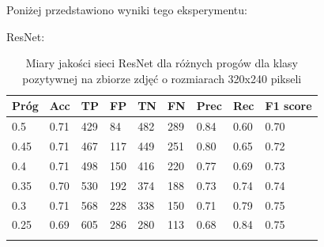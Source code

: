 \documentclass[polish,12pt]{aghthesis}
\begin{document}
\vspace{3mm}
\par\noindent Poniżej przedstawiono wyniki tego eksperymentu:
\vspace{3mm}
\par\noindent ResNet:
 \begin{longtable}[h!]{|m{2.0cm}|m{1.2cm}|m{1.2cm}|m{1.2cm}|m{1.2cm}|m{1.2cm}|m{1.2cm}|m{1.2cm}|m{1.6cm}|}
 \hline
 Próg & Acc & TP & FP & TN & FN & Prec & Rec & F1 score\\
 \hline
 0.5 & 0.71 & 429 & 84 & 482 & 289 & 0.84 & 0.60 & 0.70\\
 \hline
 0.45 & 0.71 & 467 & 117 & 449 & 251 & 0.80 & 0.65 & 0.72\\
 \hline
 0.4 & 0.71 & 498 & 150 & 416 & 220 & 0.77 & 0.69 & 0.73\\
 \hline
 0.35 & 0.70 & 530 & 192 & 374 & 188 & 0.73 & 0.74 & 0.74 \\
 \hline
 0.3 & 0.71 & 568 & 228 & 338 & 150 & 0.71 & 0.79 & 0.75\\
 \hline
 0.25 & 0.69 & 605 & 286 & 280 & 113 & 0.68 & 0.84 & 0.75\\
 \hline
\caption{Miary jakości sieci ResNet dla różnych progów dla klasy pozytywnej na zbiorze zdjęć o rozmiarach 320x240 pikseli}
\label{table:11}
\end{longtable}
\end{document}
